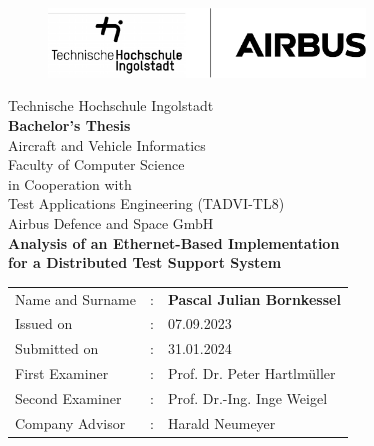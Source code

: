 
\begin{titlepage}	
	\begin{figure}[!h]
		\centering
		\includegraphics[width={0.75\textwidth}]{figures/logo.pdf}	
	\end{figure}																		
	
	\vfill
	
	\begin{center}
		\Large{Technische Hochschule Ingolstadt}	 \\ 
		\huge\textbf{
			Bachelor's Thesis}\\[0.7em]
		\normalsize
			Aircraft and Vehicle Informatics\\ Faculty of Computer Science\\ [2.9em]
			
		\normalsize
			in Cooperation with\\Test Applications Engineering (TADVI-TL8)\\ Airbus Defence and Space GmbH\\ [5em]
	
		\Large\textbf{Analysis of an Ethernet-Based Implementation\\ for a Distributed Test Support System}	 \\ 

	\end{center}

	\vfill
	\vfill
	
	\begin{tabular}{lll}
		Name and Surname &: & \textbf{Pascal Julian Bornkessel}	\\ [2em]
		
		Issued on &:	& 07.09.2023	\\ [1em] %
		Submitted on &:	& 31.01.2024\\ [2em] %
		
		First Examiner &: 	& Prof. Dr. Peter Hartlmüller\\ [1em]
		Second Examiner &: 	& Prof. Dr.-Ing. Inge Weigel\\[2em]
		
		Company Advisor &:	& Harald Neumeyer \\ %
	\end{tabular}
	
\end{titlepage}

\restoregeometry